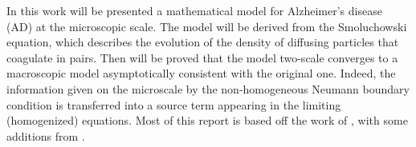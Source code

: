 \documentclass[11pt,a4paper]{article}
\begin{document}


In this work will be presented a mathematical model for Alzheimer's disease (AD) at the microscopic scale. The model will be derived from the Smoluchowski equation, which describes the evolution of the density of diffusing particles that coagulate in pairs. Then will be proved that the model two-scale converges to a macroscopic model asymptotically consistent with the original one. Indeed, the information given on the microscale by the non-homogeneous Neumann boundary condition is transferred into a source term appearing in the limiting (homogenized) equations. Most of this report is based off the work of \cite{Franchi_Lorenzani_2016}, with some additions from \cite{Bertsch}.









\newpage
\begin{appendices}
    \appendix
    
    \newpage
    
\end{appendices}


\end{document}
